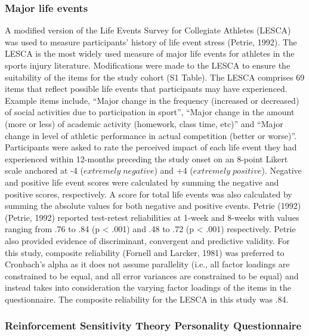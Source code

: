 \documentclass[
  english,
  man]{apa6}
\begin{document}
\hypertarget{major-life-events}{%
\subsubsection{Major life events}\label{major-life-events}}

A modified version of the Life Events Survey for Collegiate Athletes (LESCA) was used to measure participants' history of life event stress (Petrie, 1992).
The LESCA is the most widely used measure of major life events for athletes in the sports injury literature.
Modifications were made to the LESCA to ensure the suitability of the items for the study cohort (S1 Table).
The LESCA comprises 69 items that reflect possible life events that participants may have experienced. Example items include, ``Major change in the frequency (increased or decreased) of social activities due to participation in sport'', ``Major change in the amount (more or less) of academic activity (homework, class time, etc)'' and ``Major change in level of athletic performance in actual competition (better or worse)''. Participants were asked to rate the perceived impact of each life event they had experienced within 12-months preceding the study onset on an 8-point Likert scale anchored at -4 (\(extremely\;negative\)) and +4 (\(extremely\;positive\)).
Negative and positive life event scores were calculated by summing the negative and positive scores, respectively. A score for total life events was also calculated by summing the absolute values for both negative and positive events.
Petrie (1992) (Petrie, 1992) reported test-retest reliabilities at 1-week and 8-weeks with values ranging from .76 to .84 (p \textless{} .001) and .48 to .72 (p \textless{} .001) respectively. Petrie also provided evidence of discriminant, convergent and predictive validity. For this study, composite reliability (Fornell and Larcker, 1981) was preferred to Cronbach's alpha as it does not assume parallelity (i.e., all factor loadings are constrained to be equal, and all error variances are constrained to be equal) and instead takes into consideration the varying factor loadings of the items in the questionnaire. The composite reliability for the LESCA in this study was .84.

\hypertarget{reinforcement-sensitivity-theory-personality-questionnaire}{%
\subsubsection{Reinforcement Sensitivity Theory Personality Questionnaire}\label{reinforcement-sensitivity-theory-personality-questionnaire}}
\end{document}
